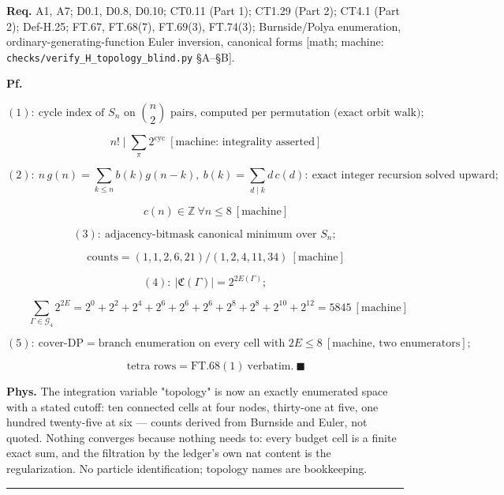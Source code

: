 \begin{theorem}
\textbf{Req.} A1, A7; D0.1, D0.8, D0.10; CT0.11 (Part 1); CT1.29 (Part 2); CT4.1 (Part 2); Def-H.25; FT.67, FT.68(7), FT.69(3), FT.74(3); Burnside/Polya enumeration, ordinary-generating-function Euler inversion, canonical forms [math; machine: \texttt{checks/\allowbreak{}verify\_\allowbreak{}H\_\allowbreak{}topology\_\allowbreak{}blind.py} §A–§B].

\textbf{Pf.}

\[
(1):\ \text{cycle index of }S_n\text{ on }\binom n2\text{ pairs, computed per permutation (exact orbit walk)};
\]

\[
\qquad n!\mid\sum_\pi2^{\mathrm{cyc}}\ [\text{machine: integrality asserted}]
\]

\[
(2):\ n\,g(n)=\sum_{k\le n}b(k)g(n-k),\ b(k)=\sum_{d\mid k}d\,c(d):\ \text{exact integer recursion solved upward};
\]

\[
\qquad c(n)\in\mathbb Z\ \forall n\le8\ [\text{machine}]
\]

\[
(3):\ \text{adjacency-bitmask canonical minimum over }S_n;
\]

\[
\qquad \text{counts}=(1,1,2,6,21)/(1,2,4,11,34)\ [\text{machine}]
\]

\[
(4):\ |\mathfrak C(\Gamma)|=2^{2E(\Gamma)};
\]

\[
\qquad \textstyle\sum_{\Gamma\in\mathcal G_4}2^{2E}=2^0+2^2+2^4+2^6+2^6+2^6+2^8+2^8+2^{10}+2^{12}=5845\ [\text{machine}]
\]

\[
(5):\ \text{cover-DP}=\text{branch enumeration on every cell with }2E\le8\ [\text{machine, two enumerators}];
\]

\[
\qquad \text{tetra rows}=\mathrm{FT.68}(1)\ \text{verbatim}.\ \blacksquare
\]

\textbf{Phys.} The integration variable "topology" is now an exactly enumerated space with a stated cutoff: ten connected cells at four nodes, thirty-one at five, one hundred twenty-five at six — counts derived from Burnside and Euler, not quoted. Nothing converges because nothing needs to: every budget cell is a finite exact sum, and the filtration by the ledger's own nat content is the regularization. No particle identification; topology names are bookkeeping.

\vspace{2pt}\noindent\rule{\textwidth}{0.4pt}\vspace{2pt}

\end{theorem}

